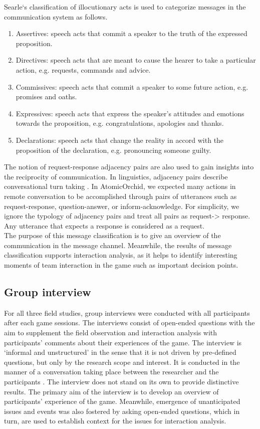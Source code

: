 Searle`s classification of illocutionary acts is used to categorize messages in the communication system as follows.\\

\begin{enumerate}
\item Assertives: speech acts that commit a speaker to the truth of the expressed proposition.
\item Directives: speech acts that are meant to cause the hearer to take a particular action, e.g. requests, commands and advice.
\item Commissives: speech acts that commit a speaker to some future action, e.g. promises and oaths.
\item Expressives: speech acts that express the speaker's attitudes and emotions towards the proposition, e.g. congratulations, apologies and thanks.
\item Declarations: speech acts that change the reality in accord with the proposition of the declaration, e.g. pronouncing someone guilty.
\end{enumerate}

The notion of request-response adjacency pairs are also used to gain insights into the reciprocity of communication. In linguistics, adjacency pairs describe conversational turn taking \citep{Avrahami}. In AtomicOrchid, we expected many actions in remote conversation to be accomplished through pairs of utterances such as request-response, question-answer, or inform-acknowledge. For simplicity, we ignore the typology of adjacency pairs and treat all pairs as request-> response. Any utterance that expects a response is considered as a request.\\

The purpose of this message classification is to give an overview of the communication in the message channel. Meanwhile, the results of message classification supports interaction analysis, as it helps to identify interesting moments of team interaction in the game such as important decision points.\\

\subsection{Group interview}
For all three field studies, group interviews were conducted with all participants after each game sessions. The interviews consist of open-ended questions with the aim to supplement the field observation and interaction analysis with participants' comments about their experiences of the game. The interview is `informal and unstructured' in the sense that it is not driven by pre-defined questions, but only by the research scope and interest. It is conducted in the manner of a conversation taking place between the researcher and the participants \citep{Crabtree2012}. The interview does not stand on its own to provide distinctive results. The primary aim of the interview is to develop an overview of participants' experience of the game. Meanwhile, emergence of unanticipated issues and events was also fostered by asking open-ended questions, which in turn, are used to establish context for the issues for interaction analysis.\\

